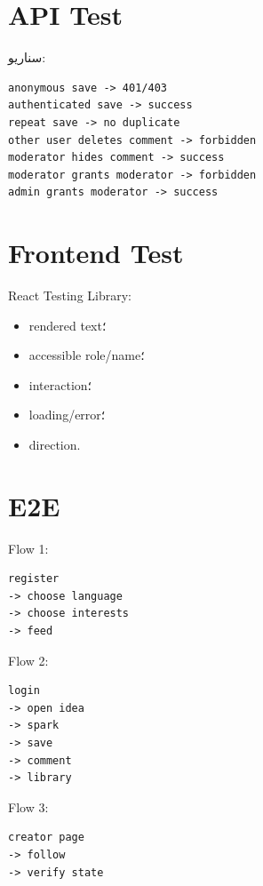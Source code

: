 \section{API Test}

سناریو:
\begin{latin}
\begin{lstlisting}
anonymous save -> 401/403
authenticated save -> success
repeat save -> no duplicate
other user deletes comment -> forbidden
moderator hides comment -> success
moderator grants moderator -> forbidden
admin grants moderator -> success
\end{lstlisting}
\end{latin}

\section{Frontend Test}

React Testing Library:
\begin{itemize}
  \item rendered text؛
  \item accessible role/name؛
  \item interaction؛
  \item loading/error؛
  \item direction.
\end{itemize}

\section{E2E}

Flow 1:
\begin{latin}
\begin{lstlisting}
register
-> choose language
-> choose interests
-> feed
\end{lstlisting}
\end{latin}

Flow 2:
\begin{latin}
\begin{lstlisting}
login
-> open idea
-> spark
-> save
-> comment
-> library
\end{lstlisting}
\end{latin}

Flow 3:
\begin{latin}
\begin{lstlisting}
creator page
-> follow
-> verify state
\end{lstlisting}
\end{latin}

